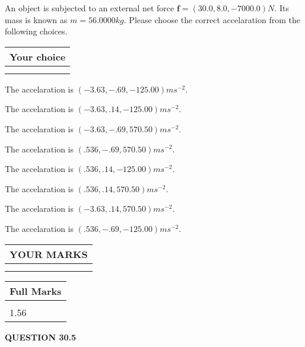 \documentclass[12pt]{article}
\begin{document}
  
 
 
An object is subjected to an external net force $\mathbf{f}=
(30.0 , 8.0 , -7000.0) N$.
Its mass is known as $m= %
56.0000 kg$. Please choose the
correct accelaration from the following choices.
 
  
  
\noindent\hspace{3.0in} \begin{tabular}{|l|}
\hline
Your choice \\
\hline
 \\ 
 \\ 
\hline
\end{tabular}
  
  
 
 
The accelaration is $  %
(
-3.63,
-.69,
-125.00)
ms^{-2} $.
 
 
The accelaration is $  %
(
-3.63,
.14,
-125.00)
ms^{-2} $.
 
 
The accelaration is $  %
(
-3.63,
-.69,
570.50)
ms^{-2} $.
 
 
The accelaration is $  %
(
.536,
-.69,
570.50)
ms^{-2} $.
 
 
The accelaration is $  %
(
.536,
.14,
-125.00)
ms^{-2} $.
 
 
The accelaration is $  %
(
.536,
.14,
570.50)
ms^{-2} $.
 
 
The accelaration is $  %
(
-3.63,
.14,
570.50)
ms^{-2} $.
 
 
The accelaration is $  %
(
.536,
-.69,
-125.00)
ms^{-2} $.
 
 
 

 

 
\vspace{0.3in}
  
\vspace{0.2in}
  
\noindent\begin{tabular}{|l|}
\hline
 YOUR MARKS  \\
\hline
 \\ 
 \\ 
\hline
\end{tabular}
\hspace{0.05in} \begin{tabular}{|l|}
\hline
 Full Marks  \\
\hline
 \\ 
1.56 \\
\hline
\end{tabular}
{\textbf{\Large{QUESTION
30.5 
}}}
  
\end{document}
